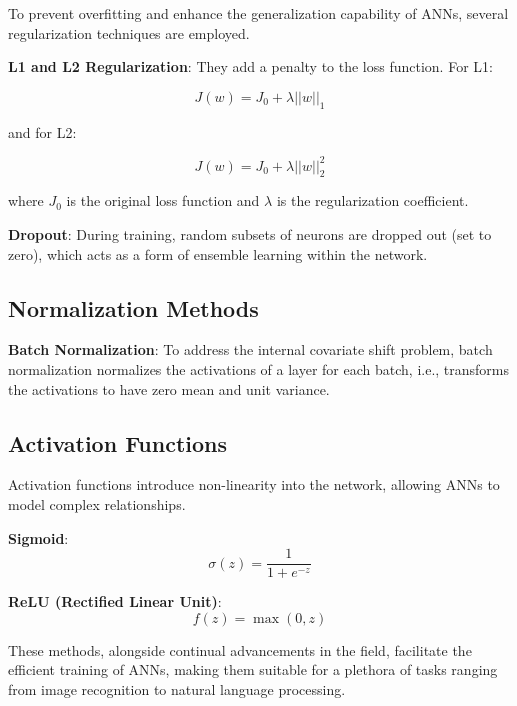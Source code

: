 \documentclass{article}
\begin{document}
To prevent overfitting and enhance the generalization capability of ANNs, several regularization techniques are employed.

\noindent \textbf{L1 and L2 Regularization}:
They add a penalty to the loss function. For L1:

\begin{equation}
J(w) = J_0 + \lambda ||w||_1
\end{equation}

and for L2:

\begin{equation}
J(w) = J_0 + \lambda ||w||_2^2
\end{equation}

where \( J_0 \) is the original loss function and \( \lambda \) is the regularization coefficient.

\noindent \textbf{Dropout}:
During training, random subsets of neurons are dropped out (set to zero), which acts as a form of ensemble learning within the network.

\subsection*{Normalization Methods}

\noindent \textbf{Batch Normalization}:
To address the internal covariate shift problem, batch normalization normalizes the activations of a layer for each batch, i.e., transforms the activations to have zero mean and unit variance.

\subsection*{Activation Functions}

Activation functions introduce non-linearity into the network, allowing ANNs to model complex relationships.

\noindent \textbf{Sigmoid}:
\begin{equation}
\sigma(z) = \frac{1}{1 + e^{-z}}
\end{equation}

\noindent \textbf{ReLU (Rectified Linear Unit)}:
\begin{equation}
f(z) = \max(0, z)
\end{equation}

These methods, alongside continual advancements in the field, facilitate the efficient training of ANNs, making them suitable for a plethora of tasks ranging from image recognition to natural language processing.
\end{document}
